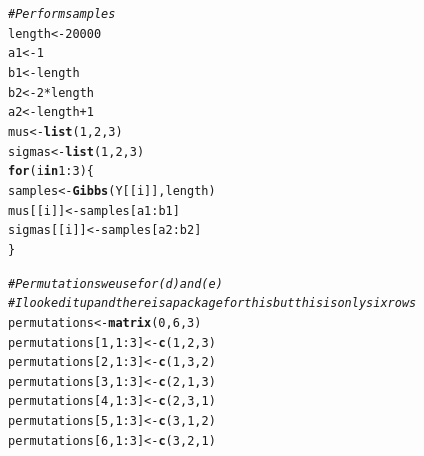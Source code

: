 \documentclass{article}\usepackage[]{graphicx}\usepackage[]{xcolor}
\makeatletter
\newcommand{\hlnum}[1]{\textcolor[rgb]{0.686,0.059,0.569}{#1}}%
\newcommand{\hlcom}[1]{\textcolor[rgb]{0.678,0.584,0.686}{\textit{#1}}}%
\newcommand{\hlopt}[1]{\textcolor[rgb]{0,0,0}{#1}}%
\newcommand{\hldef}[1]{\textcolor[rgb]{0.345,0.345,0.345}{#1}}%
\newcommand{\hlkwa}[1]{\textcolor[rgb]{0.161,0.373,0.58}{\textbf{#1}}}%
\newcommand{\hlkwb}[1]{\textcolor[rgb]{0.69,0.353,0.396}{#1}}%
\newcommand{\hlkwd}[1]{\textcolor[rgb]{0.737,0.353,0.396}{\textbf{#1}}}%
\newenvironment{kframe}{%
 \def\at@end@of@kframe{}%
 \ifinner\ifhmode%
  \def\at@end@of@kframe{\end{minipage}}%
  \begin{minipage}{\columnwidth}%
 \fi\fi%
 \def\FrameCommand##1{\hskip\@totalleftmargin \hskip-\fboxsep
 \colorbox{shadecolor}{##1}\hskip-\fboxsep
     \hskip-\linewidth \hskip-\@totalleftmargin \hskip\columnwidth}%
 \MakeFramed {\advance\hsize-\width
   \@totalleftmargin\z@ \linewidth\hsize
   \@setminipage}}%
 {\par\unskip\endMakeFramed%
 \at@end@of@kframe}
\newenvironment{knitrout}{}{} %
\makeatother
\begin{document}
\begin{knitrout}
\begin{kframe}
\begin{alltt}
\hlcom{# Perform samples}
\hldef{length} \hlkwb{<-} \hlnum{20000}
\hldef{a1} \hlkwb{<-} \hlnum{1}
\hldef{b1} \hlkwb{<-} \hldef{length}
\hldef{b2} \hlkwb{<-} \hlnum{2} \hlopt{*} \hldef{length}
\hldef{a2} \hlkwb{<-} \hldef{length} \hlopt{+} \hlnum{1}
\hldef{mus} \hlkwb{<-} \hlkwd{list}\hldef{(}\hlnum{1}\hldef{,} \hlnum{2}\hldef{,} \hlnum{3}\hldef{)}
\hldef{sigmas} \hlkwb{<-} \hlkwd{list}\hldef{(}\hlnum{1}\hldef{,} \hlnum{2}\hldef{,} \hlnum{3}\hldef{)}
\hlkwa{for} \hldef{(i} \hlkwa{in} \hlnum{1}\hlopt{:}\hlnum{3}\hldef{) \{}
  \hldef{samples} \hlkwb{<-} \hlkwd{Gibbs}\hldef{(Y[[i]], length)}
  \hldef{mus[[i]]} \hlkwb{<-} \hldef{samples[a1}\hlopt{:}\hldef{b1]}
  \hldef{sigmas[[i]]} \hlkwb{<-} \hldef{samples[a2}\hlopt{:}\hldef{b2]}
\hldef{\}}

\hlcom{# Permutations we use for (d) and (e)}
\hlcom{# I looked it up and there is a package for this but this is only six rows}
\hldef{permutations} \hlkwb{<-} \hlkwd{matrix}\hldef{(}\hlnum{0}\hldef{,} \hlnum{6}\hldef{,} \hlnum{3}\hldef{)}
\hldef{permutations[}\hlnum{1}\hldef{,} \hlnum{1}\hlopt{:}\hlnum{3}\hldef{]} \hlkwb{<-} \hlkwd{c}\hldef{(}\hlnum{1}\hldef{,} \hlnum{2}\hldef{,} \hlnum{3}\hldef{)}
\hldef{permutations[}\hlnum{2}\hldef{,} \hlnum{1}\hlopt{:}\hlnum{3}\hldef{]} \hlkwb{<-} \hlkwd{c}\hldef{(}\hlnum{1}\hldef{,} \hlnum{3}\hldef{,} \hlnum{2}\hldef{)}
\hldef{permutations[}\hlnum{3}\hldef{,} \hlnum{1}\hlopt{:}\hlnum{3}\hldef{]} \hlkwb{<-} \hlkwd{c}\hldef{(}\hlnum{2}\hldef{,} \hlnum{1}\hldef{,} \hlnum{3}\hldef{)}
\hldef{permutations[}\hlnum{4}\hldef{,} \hlnum{1}\hlopt{:}\hlnum{3}\hldef{]} \hlkwb{<-} \hlkwd{c}\hldef{(}\hlnum{2}\hldef{,} \hlnum{3}\hldef{,} \hlnum{1}\hldef{)}
\hldef{permutations[}\hlnum{5}\hldef{,} \hlnum{1}\hlopt{:}\hlnum{3}\hldef{]} \hlkwb{<-} \hlkwd{c}\hldef{(}\hlnum{3}\hldef{,} \hlnum{1}\hldef{,} \hlnum{2}\hldef{)}
\hldef{permutations[}\hlnum{6}\hldef{,} \hlnum{1}\hlopt{:}\hlnum{3}\hldef{]} \hlkwb{<-} \hlkwd{c}\hldef{(}\hlnum{3}\hldef{,} \hlnum{2}\hldef{,} \hlnum{1}\hldef{)}



\end{alltt}
\end{kframe}
\end{knitrout}
\end{document}
